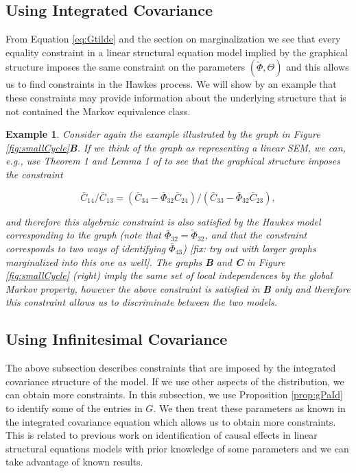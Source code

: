 \documentclass[accepted]{uai2021} %
\newtheorem{exmp}[thm]{Example}
\begin{document}
\subsection{Using Integrated Covariance}

From Equation \ref{eq:Gtilde} and the section on marginalization we see that 
every equality 
constraint in a linear structural equation model implied by the graphical 
structure imposes the same constraint
on the parameters $(\tilde{\Phi}, \Theta)$ and this allows us to find 
constraints 
in the Hawkes process. We will show by an example that these constraints may 
provide information about the underlying structure that is not contained the 
Markov equivalence class.

\begin{exmp}
	\label{exmp:eqSmallCycle}
	Consider again the example illustrated by the graph in Figure 
	\ref{fig:smallCycle}\textbf{B}. If we think of the graph as representing a 
	linear SEM, we can, e.g., use Theorem 1 and Lemma 1 of \cite{chen2014} to 
	see that the graphical structure imposes the constraint 
	
	$$\bar{C}_{14}/\bar{C}_{13} = (\bar{C}_{34} - 
	\bar{\Phi}_{32}\bar{C}_{24})/(\bar{C}_{33} - 
	\bar{\Phi}_{32}\bar{C}_{23}),$$ 
	
	and 
	therefore this algebraic constraint is also satisfied by the Hawkes model 
	corresponding to the graph (note that $\bar{\Phi}_{32} = 
	\tilde{\Phi}_{32}$, and that the constraint corresponds to
	two ways of identifying $\bar{\Phi}_{43}$) 
	[fix: try out with larger graphs marginalized 
	into this one as well]. The graphs \textbf{B} and \textbf{C} in Figure 
	\ref{fig:smallCycle} (right) 
	imply the same set of local independences
	by the global Markov property, however the above constraint is satisfied in 
	\textbf{B} only and therefore this constraint allows us to 
	discriminate between the two models.
\end{exmp}


\subsection{Using Infinitesimal Covariance}
\label{ssec:eqInfCov}

The above subsection describes constraints that are imposed by the integrated 
covariance structure of the model. If we use other aspects of the distribution, 
we can obtain more constraints. In this subsection, we use Proposition 
\ref{prop:gPaId} to identify some of the entries in $G$. We then treat these 
parameters as known in the integrated covariance equation which allows us to 
obtain more constraints. This is related to previous work on identification of 
causal effects in linear structural equations models with prior knowledge of 
some parameters and we can take advantage of known results.
\end{document}
